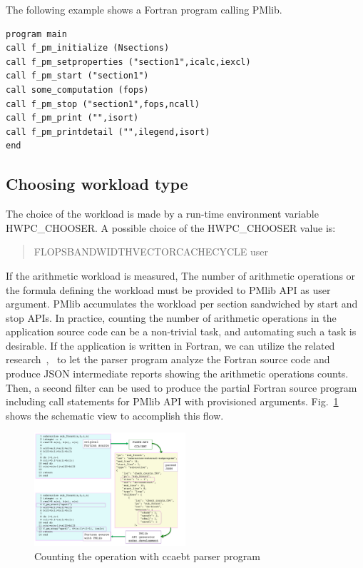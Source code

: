 \documentclass[conference]{IEEEtran}
\begin{document}
The following example shows a Fortran program calling PMlib.

\begin{lstlisting}
program main
call f_pm_initialize (Nsections)
call f_pm_setproperties ("section1",icalc,iexcl)
call f_pm_start ("section1")
call some_computation (fops)
call f_pm_stop ("section1",fops,ncall)
call f_pm_print ("",isort)
call f_pm_printdetail ("",ilegend,isort)
end
\end{lstlisting}

%
\subsection{Choosing workload type}
\label{subsection:Choosing-workload-type}

The choice of the workload is made by a
run-time environment variable HWPC\_CHOOSER.
A possible choice of the HWPC\_CHOOSER value is:
\begin{quote}
\begin{small}
FLOPS\textbar BANDWIDTH\textbar VECTOR\textbar CACHE\textbar CYCLE%
\textbar user
\end{small}
\end{quote}

If the arithmetic workload is measured,
The number of arithmetic operations or the formula defining the workload
must be provided to PMlib API as user argument.
PMlib accumulates the workload per section sandwiched by start and stop APIs.
In practice, counting the number of arithmetic operations in the application
source code can be a non-trivial task, and automating such a task is desirable.
%
If the application is written in Fortran,
we can utilize the related research~\cite{Hoshimoto:2015},~\cite{ccaebt:HPCAsia2018}
to let the parser program analyze the Fortran source code
and produce JSON intermediate reports showing the arithmetic operations counts.
Then, a second filter can be used to produce the partial Fortran source program
including call statements for PMlib API with provisioned arguments.
Fig.~\ref{fig:ccaebt4PMlib} shows the schematic view to accomplish this flow.

\begin{figure}[tb]
\centering
\includegraphics[width=0.5\textwidth]{figs/ccaebt4PMlib.pdf}
\caption{Counting the operation with ccaebt parser program}
\label{fig:ccaebt4PMlib}
\end{figure}
\end{document}
